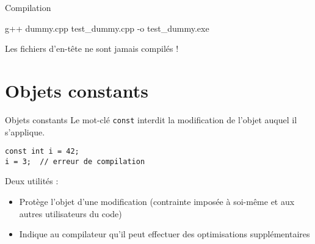 \documentclass[c]{beamer}
\newcommand{\inline}[1]{\texttt{#1}}
\begin{document}

\begin{frame}{Compilation}
\begin{prompt}
g++ dummy.cpp test\_dummy.cpp -o test\_dummy.exe
\end{prompt}

\begin{cbox}[][][\centering]
 Les fichiers d'en-tête ne sont jamais compilés !
\end{cbox}
\end{frame}


\part{Objets constants}
\frame{\partpage}


\begin{frame}[fragile]{Objets constants}
Le mot-clé \inline{const} interdit la modification de l'objet auquel il s'applique.
\vspace{1em}

\begin{verbatim}
const int i = 42;
i = 3;  // erreur de compilation
\end{verbatim}

\vspace{1em}
\pause

Deux utilités :
\begin{itemize}
  \item Protège l'objet d'une modification (contrainte imposée à soi-même et aux autres utilisateurs du code)
  \item Indique au compilateur qu'il peut effectuer des optimisations supplémentaires
\end{itemize}

\end{frame}

\end{document}

